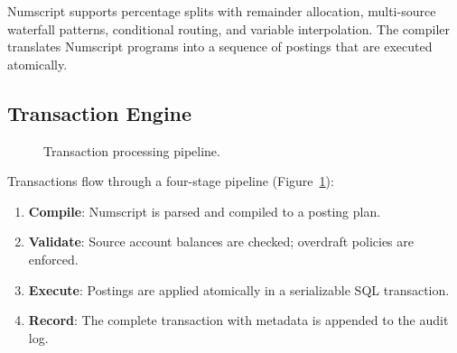 \documentclass[11pt,twocolumn]{article}
\begin{document}
Numscript supports percentage splits with remainder allocation, multi-source waterfall patterns, conditional routing, and variable interpolation. The compiler translates Numscript programs into a sequence of postings that are executed atomically.

\subsection{Transaction Engine}

\begin{figure}[t]
\centering
{}
\caption{Transaction processing pipeline.}
\label{fig:ledger}
\end{figure}

Transactions flow through a four-stage pipeline (Figure~\ref{fig:ledger}):

\begin{enumerate}
    \item \textbf{Compile}: Numscript is parsed and compiled to a posting plan.
    \item \textbf{Validate}: Source account balances are checked; overdraft policies are enforced.
    \item \textbf{Execute}: Postings are applied atomically in a serializable SQL transaction.
    \item \textbf{Record}: The complete transaction with metadata is appended to the audit log.
\end{enumerate}
\end{document}
